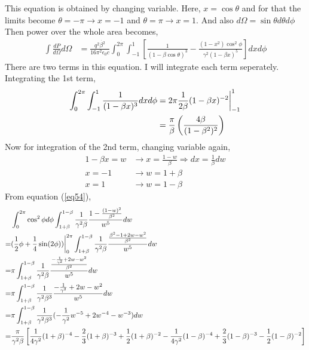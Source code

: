 \documentclass[11pt,a4paper]{article}
\begin{document}
This equation is obtained by changing variable. 
Here, $x=\cos{\theta}$ and for that the limits become $\theta = -\pi \rightarrow x = -1$ and $\theta = \pi \rightarrow x = 1$.
And also $d\Omega = \sin{\theta}d\theta d\phi $
Then power over the whole area becomes,
\begin{align}                                                                                                                     
    \int \frac{dP}{d\Omega} d\Omega &= \frac{q^2\dot{\beta^2}}{16\pi^2 \epsilon_0c}\int_{0}^{2\pi} \int_{-1}^{1} \left[ \frac{1}{(1-\beta \cos{\theta})^3} - \frac{(1-x^2)\cos^2{\phi}}{\gamma^2(1-\beta x)^5} \right] dx d\phi \label{eq54}
\end{align}
There are two terms in this equation. 
I will integrate each term seperately. 
Integrating the 1st term,
\begin{align}
    \int_{0}^{2\pi} \int_{-1}^{1} \frac{1}{(1-\beta x)^3} dxd\phi &= 2\pi \frac{1}{2\beta}(1-\beta x)^{-2}\biggr|^1_{-1} \notag \\
                                                                  &= \frac{\pi}{\beta}\left( \frac{4\beta}{(1-\beta^2)^2} \right)
\end{align}
Now  for integration of the 2nd term, changing variable again,
\begin{align*}
    1 - \beta x = w &\rightarrow x = \frac{1-w}{\beta} \Rightarrow dx = \frac{1}{\beta}dw \\
    x = -1 &\rightarrow w = 1+\beta \\
    x = 1 &\rightarrow w= 1-\beta
\end{align*}
From equation (\ref{eq54}),
\begin{align}
    & \int_{0}^{2\pi} \cos^2{\phi}d\phi \int_{1+\beta}^{1-\beta} \frac{1}{\gamma^2 \beta} \frac{1-\frac{(1-w)^2}{\beta^2}}{w^5}dw \notag \\
    =& (\frac{1}{2}\phi + \frac{1}{4}\sin(2\phi))\biggr|_0^{2\pi} \int_{1+\beta}^{1-\beta} \frac{1}{\gamma^2 \beta} \frac{\frac{\beta^2-1 + 2w -w^2}{\beta^2}}{w^5} dw \notag \\
    =& \pi \int_{1+\beta}^{1-\beta} \frac{1}{\gamma^2 \beta} \frac{\frac{-\frac{1}{\gamma^2} + 2w -w^2}{\beta^2}}{w^5} dw \notag \\
    =& \pi \int_{1+\beta}^{1-\beta} \frac{1}{\gamma^2 \beta^3} \frac{-\frac{1}{\gamma^2} + 2w -w^2}{w^5} dw \notag \\
    =& \pi \int_{1+\beta}^{1-\beta} \frac{1}{\gamma^2 \beta^3}(-\frac{1}{\gamma^2}w^{-5} + 2w^{-4} - w^{-3}) dw \notag \\
    =& \frac{\pi}{\gamma^2 \beta}\left[ \frac{1}{4\gamma^2} (1+\beta)^{-4} -\frac{2}{3}(1+\beta)^{-3} +\frac{1}{2}(1+\beta)^{-2} - \frac{1}{4\gamma^2} (1-\beta)^{-4} +\frac{2}{3}(1-\beta)^{-3} -\frac{1}{2}(1-\beta)^{-2} \right] \notag
\end{align}
\end{document}
